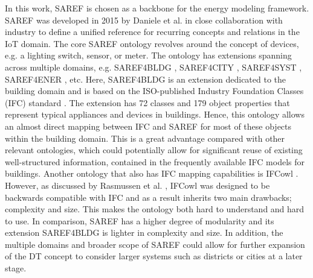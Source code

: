 





In this work, SAREF is chosen as a backbone for the energy modeling framework. SAREF was developed in 2015 by Daniele et al. \cite{Daniele2015} in close collaboration with industry to define a unified reference for recurring concepts and relations in the IoT domain. The core SAREF ontology revolves around the concept of devices, e.g. a lighting switch, sensor, or meter. The ontology has extensions spanning across multiple domains, e.g. SAREF4BLDG \cite{saref4bldg}, SAREF4CITY \cite{saref4city}, SAREF4SYST \cite{lefran2019a}, SAREF4ENER \cite{Daniele2020}, etc. Here, SAREF4BLDG is an extension dedicated to the building domain and is based on the ISO-published Industry Foundation Classes (IFC) standard \cite{unknown2018a}. The extension has 72 classes and 179 object properties that represent typical appliances and devices in buildings. Hence, this ontology allows an almost direct mapping between IFC and SAREF for most of these objects within the building domain. This is a great advantage compared with other relevant ontologies, which could potentially allow for significant reuse of existing well-structured information, contained in the frequently available IFC models for buildings. Another ontology that also has IFC mapping capabilities is IFCowl \cite{IFCowl}. However, as discussed by Rasmussen et al. \cite{Rasmussen2020}, IFCowl was designed to be backwards compatible with IFC and as a result inherits two main drawbacks; complexity and size. This makes the ontology both hard to understand and hard to use. In comparison, SAREF has a higher degree of modularity and its extension SAREF4BLDG is lighter in complexity and size. In addition, the multiple domains and broader scope of SAREF could allow for further expansion of the DT concept to consider larger systems such as districts or cities at a later stage. 




